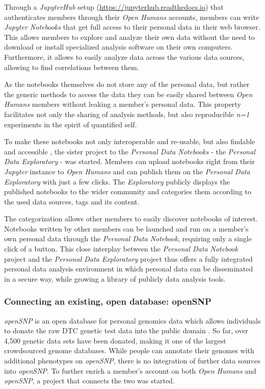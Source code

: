 \documentclass[a4paper,num-refs]{oup-contemporary}
\begin{document}
Through a \textit{JupyterHub} setup (\url{https://jupyterhub.readthedocs.io}) that authenticates members through their \textit{Open Humans} accounts, members can write \textit{Jupyter Notebooks} \cite{Kluyver:2016aa} that get full access to their personal data in their web browser. This allows members to explore and analyze their own data without the need to download or install specialized analysis software on their own computers. Furthermore, it allows to easily analyze data across the various data sources, allowing to find correlations between them.

As the notebooks themselves do not store any of the personal data, but rather the generic methods to access the data they can be easily shared between \textit{Open Humans} members without leaking a member's personal data. This property facilitates not only the sharing of analysis methods, but also reproducible \textit{n=1} experiments in the spirit of quantified self.

To make these notebooks not only interoperable and re-usable, but also findable and accessible \cite{Wilkinson2016}, the sister project to the  \textit{Personal Data Notebooks} - the \textit{Personal Data Exploratory} -  was started. 
Members can upload notebooks right from their \textit{Jupyter} instance to \textit{Open Humans} and can publish them on the \textit{Personal Data Exploratory} with just a few clicks. The \textit{Exploratory} publicly displays the published notebooks to the wider community and categories them according to the used data sources, tags and its content.

The categorization allows other members to easily discover notebooks of interest. Notebooks written by other members can be launched and run on a member's own personal data through the \textit{Personal Data Notebook}, requiring only a single click of a button. This close interplay between the \textit{Personal Data Notebook} project and the \textit{Personal Data Exploratory} project thus offers a fully integrated personal data analysis environment in which personal data can be disseminated in a secure way, while growing a library of publicly data analysis tools.

\subsubsection{Connecting an existing, open database: openSNP}
\textit{openSNP} is an open database for personal genomics data which allows individuals to donate the raw DTC genetic test data into the public domain \cite{Greshake2014}. So far, over 4,500 genetic data sets have been donated, making it one of the largest crowdsourced genome databases. While people can annotate their genomes with additional phenotypes on \textit{openSNP}, there is no integration of further data sources into \textit{openSNP}. To further enrich a member's account on both \textit{Open Humans} and \textit{openSNP}, a project that connects the two was started.
\end{document}
